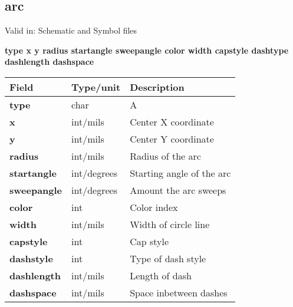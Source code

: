 \documentclass{article}
\begin{document}
\subsection{arc}

Valid in: Schematic and Symbol files

{\bf type x y radius startangle sweepangle color width capstyle dashtype dashlength dashspace }

\begin{table}[h]
\begin{tabular}{|l|l|l|} \hline
Field 		& Type/unit 	& Description \\ \hline 
\hline
{\bf type} 	& char 		& A \\ \hline
{\bf x} 	& int/mils	& Center X coordinate \\ \hline 
{\bf y} 	& int/mils	& Center Y coordinate \\ \hline
{\bf radius} 	& int/mils	& Radius of the arc \\ \hline
{\bf startangle}& int/degrees 	& Starting angle of the arc \\ \hline
{\bf sweepangle}& int/degrees	& Amount the arc sweeps \\ \hline
{\bf color} 	& int		& Color index \\ \hline
{\bf width} 	& int/mils	& Width of circle line \\ \hline
{\bf capstyle} 	& int		& Cap style \\ \hline
{\bf dashstyle} & int		& Type of dash style \\ \hline
{\bf dashlength}& int/mils	& Length of dash \\ \hline
{\bf dashspace} & int/mils	& Space inbetween dashes \\ \hline
\end{tabular}
\end{table}
\end{document}
